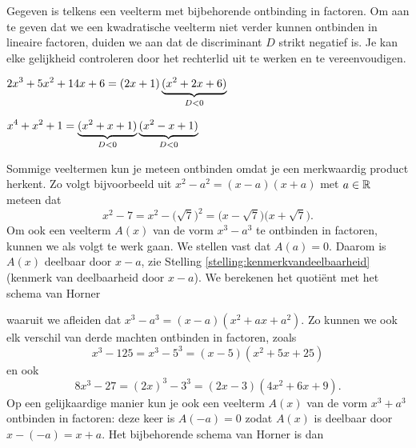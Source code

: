 \documentclass{ximera}
\begin{document}
\begin{example} 
Gegeven is telkens een veelterm met bijbehorende ontbinding in factoren. Om aan te geven dat we een kwadratische veelterm niet verder kunnen ontbinden in lineaire factoren, duiden we aan dat de discriminant $D$ strikt negatief is. Je kan elke gelijkheid controleren door het rechterlid uit te werken en te vereenvoudigen. 

\begin{question} $\displaystyle 2x^3 + 5x^2 + 14x + 6 = (2x+1)\underbrace{(x^2+2x+6)}_{D < 0}$            \end{question}
\begin{question} $\displaystyle x^4+x^2+1 = \underbrace{(x^2+x+1)}_{D < 0}\underbrace{(x^2-x+1)}_{D < 0}$ \end{question}

\end{example} 



Sommige veeltermen kun je meteen ontbinden omdat je een merkwaardig product herkent. Zo volgt bijvoorbeeld uit $x^2 - a^2 = (x-a)(x+a)$ met $a \in \mathbb{R}$ meteen dat
\[
x^2 - 7 = x^2 - \bigl(\sqrt{7}\bigr)^2 = \bigl(x-\sqrt{7})(x+\sqrt{7}\bigr). 
\]
Om ook een veelterm $A(x)$ van de vorm $x^3 - a^3$ te ontbinden in factoren, kunnen we als volgt te werk gaan.
We stellen vast dat $A(a) = 0$. Daarom is $A(x)$ deelbaar door $x-a$, zie Stelling \ref{stelling:kenmerkvandeelbaarheid} (kenmerk van deelbaarheid door $x-a$). We berekenen het quotiënt met het schema van Horner
\renewcommand{\kolbreed}{\widthof{$-a^3$}}


waaruit we afleiden dat $x^3 - a^3 = (x-a)(x^2 + ax + a^2)$. Zo kunnen we ook elk verschil van derde machten ontbinden in factoren, zoals
\[
x^3 - 125 = x^3 - 5^3 = (x-5)(x^2 + 5x + 25) 
\]
en ook
\[
8x^3 - 27 = (2x)^3 - 3^3 = (2x-3)(4x^2+6x+9).
\]
Op een gelijkaardige manier kun je ook een veelterm $A(x)$ van de vorm $x^3 + a^3$ ontbinden in factoren: deze keer is $A(-a) = 0$ zodat $A(x)$ is deelbaar door $x-(-a) = x+a$. Het bijbehorende schema van Horner is dan
\renewcommand{\kolbreed}{\widthof{$-a^3$}}
\end{document}
